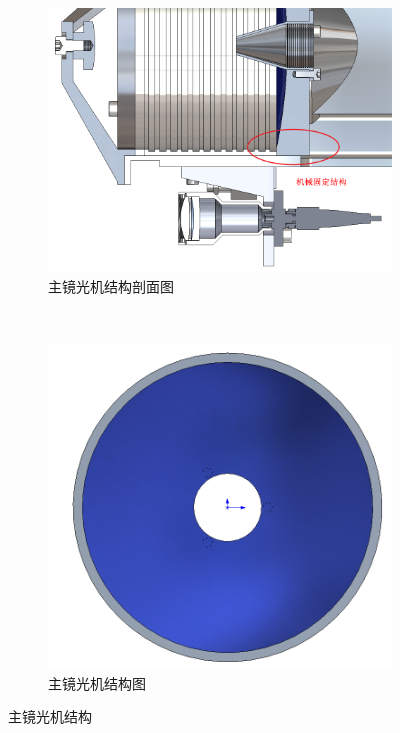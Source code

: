 \begin{figure}[!htbp]
	\centering
	\begin{subfigure}[c]{0.5\textwidth}
		\includegraphics[width=\textwidth]{./Img/RCzhujing001.png}
		\caption{主镜光机结构剖面图}
		\label{RCzhujing001.png}
	\end{subfigure}%
	~%
	\begin{subfigure}[c]{0.5\textwidth}
		\includegraphics[width=\textwidth]{./Img/RCzhujing002.png}
		\caption{主镜光机结构图}
		\label{RCzhujing002.png}
	\end{subfigure}
	\caption{主镜光机结构}
	\label{fig:MAIN-MIRROR}
\end{figure}

